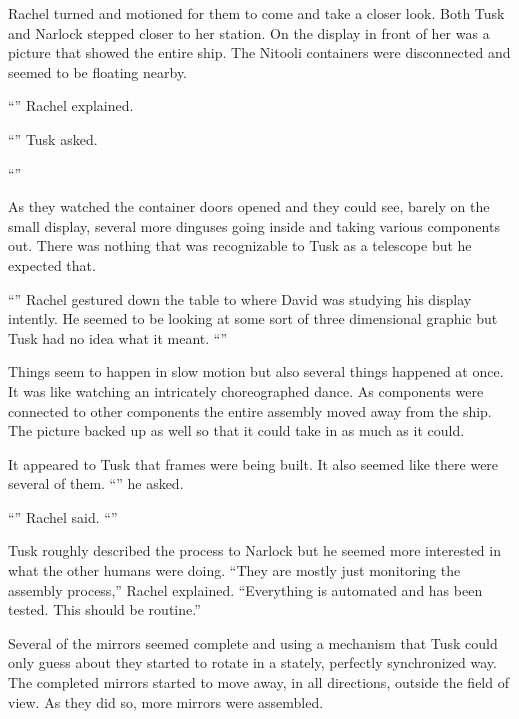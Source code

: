 Rachel turned and motioned for them to come and take a closer look. Both Tusk and Narlock
stepped closer to her station. On the display in front of her was a picture that showed the
entire ship. The Nitooli containers were disconnected and seemed to be floating nearby.

``'' Rachel explained.

``'' Tusk asked.

``''

As they watched the container doors opened and they could see, barely on the small display,
several more dinguses going inside and taking various components out. There was nothing that was
recognizable to Tusk as a telescope but he expected that.

``''
Rachel gestured down the table to where David was studying his display intently. He seemed to be
looking at some sort of three dimensional graphic but Tusk had no idea what it meant.
``''

Things seem to happen in slow motion but also several things happened at once. It was like
watching an intricately choreographed dance. As components were connected to other components
the entire assembly moved away from the ship. The picture backed up as well so that it could
take in as much as it could.

It appeared to Tusk that frames were being built. It also seemed like there were several of
them. ``'' he asked.

``'' Rachel said. ``''

Tusk roughly described the process to Narlock but he seemed more interested in what the other
humans were doing. ``They are mostly just monitoring the assembly process,'' Rachel explained.
``Everything is automated and has been tested. This should be routine.''

Several of the mirrors seemed complete and using a mechanism that Tusk could only guess about
they started to rotate in a stately, perfectly synchronized way. The completed mirrors started
to move away, in all directions, outside the field of view. As they did so, more mirrors were
assembled.

